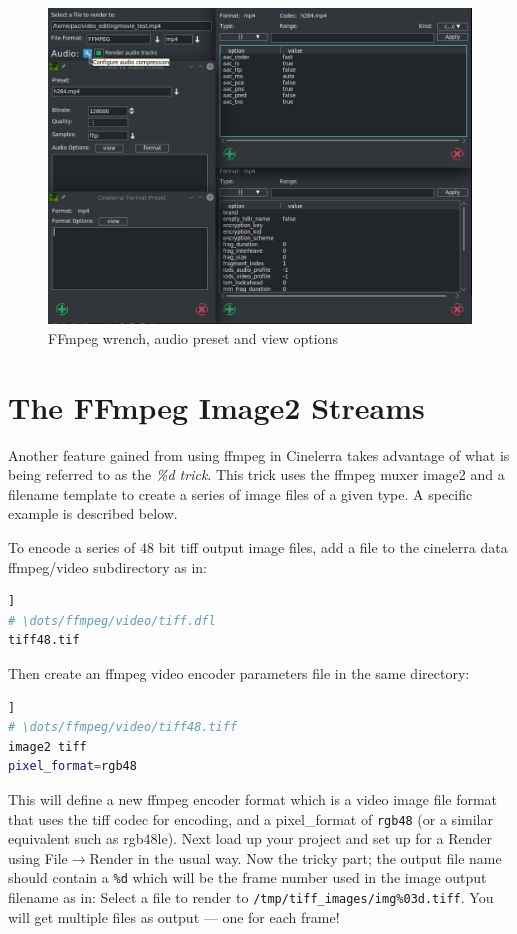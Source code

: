 \begin{figure}[htpb]
    \centering
    \includegraphics[width=0.8\linewidth]{images/audio-preset02.png}
    \caption{FFmpeg wrench, audio preset and view options}
    \label{fig:audio-preset02}
\end{figure}

\section{The FFmpeg Image2 Streams}%
\label{sec:ffmpeg_image2_streams}

Another feature gained from using ffmpeg in Cinelerra takes advantage of what is being referred to as the \textit{\%d trick}.  This trick uses the ffmpeg muxer image2 and a filename template to create a series of image files of a given type.  A specific example is described below.

To encode a series of $48$ bit tiff output image files, add a file to the cinelerra data ffmpeg/video subdirectory as in:

\begin{lstlisting}[language=bash,numbers=none]]
# \dots/ffmpeg/video/tiff.dfl
tiff48.tif
\end{lstlisting}

Then create an ffmpeg video encoder parameters file in the same directory:

\begin{lstlisting}[language=bash,numbers=none]]
# \dots/ffmpeg/video/tiff48.tiff
image2 tiff
pixel_format=rgb48
\end{lstlisting}

This will define a new ffmpeg encoder format which is a video image file format that uses the tiff codec for encoding, and a pixel\_format of \texttt{rgb48} (or a similar equivalent such as rgb48le).  Next load up your project and set up for a Render using File$\rightarrow$Render in the usual way.  Now the tricky part; the output file name should contain a \texttt{\%d} which will be the frame number used in the image output filename as in:  Select a file to render to  \texttt{/tmp/tiff\_images/img\%03d.tiff}.  You will get multiple files as output --- one for each frame!

